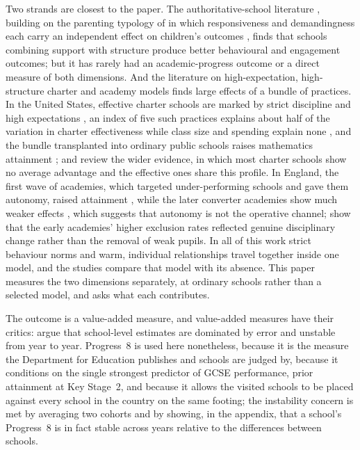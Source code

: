 Two strands are closest to the paper. The authoritative-school literature
\citep{pellerin2005,gregory2010}, building on the parenting typology of
\citet{maccoby1983} in which responsiveness and demandingness each carry an
independent effect on children's outcomes \citep{majumder2015,zhang2020},
finds that schools combining support with structure produce better
behavioural and engagement outcomes; but it has rarely had an
academic-progress outcome or a direct measure of both dimensions. And the
literature on high-expectation, high-structure charter and academy models
finds large effects of a bundle of practices. In the United States, effective
charter schools are marked by strict discipline and high expectations
\citep{abdulkadiroglu2011,angrist2010}, an index of five such practices
explains about half of the variation in charter effectiveness while class size
and spending explain none \citep{dobbie2013}, and the bundle transplanted into
ordinary public schools raises mathematics attainment \citep{fryer2014};
\citet{chabrier2016} and \citet{epple2016} review the wider evidence, in which
most charter schools show no average advantage and the effective ones share
this profile. In England, the first wave of academies, which targeted
under-performing schools and gave them autonomy, raised attainment
\citep{machin2011,eyles2016}, while the later converter academies show much
weaker effects \citep{eyles2019}, which suggests that autonomy is not the
operative channel; \citet{machin2020} show that the early academies' higher
exclusion rates reflected genuine disciplinary change rather than the removal
of weak pupils. In all of this work strict behaviour norms and warm,
individual relationships travel together inside one model, and the studies
compare that model with its absence. This paper measures the two dimensions
separately, at ordinary schools rather than a selected model, and asks what
each contributes.

The outcome is a value-added measure, and value-added measures have their
critics: \citet{gorard2010,gorard2013} argue that school-level estimates are
dominated by error and unstable from year to year. Progress~8 is used here
nonetheless, because it is the measure the Department for Education
publishes and schools are judged by, because it conditions on the single
strongest predictor of GCSE performance, prior attainment at Key Stage~2, and
because it allows the visited schools to be placed against every school in
the country on the same footing; the instability concern is met by averaging
two cohorts and by showing, in the appendix, that a school's Progress~8 is in
fact stable across years relative to the differences between schools.

